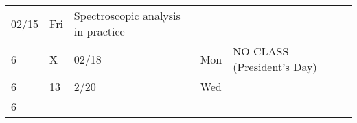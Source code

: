 \begin{longtable}[]{@{}llllll@{}}
\begin{minipage}[t]{0.06\columnwidth}
02/15\strut
\end{minipage} & \begin{minipage}[t]{0.04\columnwidth}\raggedright
Fri\strut
\end{minipage} & \begin{minipage}[t]{0.49\columnwidth}\raggedright
Spectroscopic analysis in practice\strut
\end{minipage} & \begin{minipage}[t]{0.17\columnwidth}\raggedright
\strut
\end{minipage}\tabularnewline
\begin{minipage}[t]{0.03\columnwidth}\raggedright
6\strut
\end{minipage} & \begin{minipage}[t]{0.03\columnwidth}\raggedright
X\strut
\end{minipage} & \begin{minipage}[t]{0.06\columnwidth}\raggedright
02/18\strut
\end{minipage} & \begin{minipage}[t]{0.04\columnwidth}\raggedright
Mon\strut
\end{minipage} & \begin{minipage}[t]{0.49\columnwidth}\raggedright
NO CLASS (President's Day)\strut
\end{minipage} & \begin{minipage}[t]{0.17\columnwidth}\raggedright
\strut
\end{minipage}\tabularnewline
\begin{minipage}[t]{0.03\columnwidth}\raggedright
6\strut
\end{minipage} & \begin{minipage}[t]{0.03\columnwidth}\raggedright
13\strut
\end{minipage} & \begin{minipage}[t]{0.06\columnwidth}\raggedright
2/20\strut
\end{minipage} & \begin{minipage}[t]{0.04\columnwidth}\raggedright
Wed\strut
\end{minipage} & \begin{minipage}[t]{0.49\columnwidth}\raggedright
\strut
\end{minipage} & \begin{minipage}[t]{0.17\columnwidth}\raggedright
\strut
\end{minipage}\tabularnewline
\begin{minipage}[t]{0.03\columnwidth}\raggedright
6\strut
\end{minipage} & \begin{minipage}[t]{0.03\columnwidth}\raggedright

\end{minipage}
\end{longtable}
